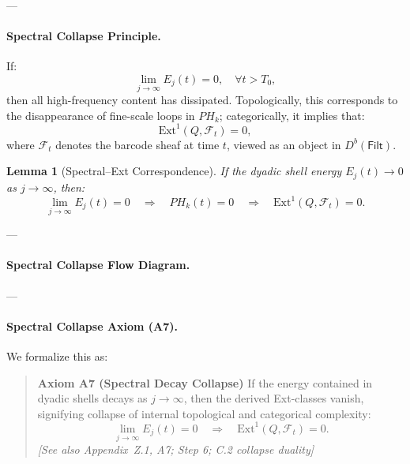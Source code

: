 \documentclass[11pt]{article}
\newtheorem{lemma}[theorem]{Lemma}
\begin{document}
---

\paragraph{Spectral Collapse Principle.}
If:
\[
\lim_{j \to \infty} E_j(t) = 0, \quad \forall t > T_0,
\]
then all high-frequency content has dissipated.  
Topologically, this corresponds to the disappearance of fine-scale loops in \( PH_k \);  
categorically, it implies that:
\[
\mathrm{Ext}^1(Q, \mathcal{F}_t) = 0,
\]
where \( \mathcal{F}_t \) denotes the barcode sheaf at time \( t \), viewed as an object in \( D^b(\mathsf{Filt}) \).

\begin{lemma}[Spectral–Ext Correspondence]
If the dyadic shell energy \( E_j(t) \to 0 \) as \( j \to \infty \), then:
\[
\lim_{j \to \infty} E_j(t) = 0 
\quad \Rightarrow \quad 
PH_k(t) = 0 
\quad \Rightarrow \quad 
\mathrm{Ext}^1(Q, \mathcal{F}_t) = 0.
\]
\end{lemma}

---

\paragraph{Spectral Collapse Flow Diagram.}

\begin{center}
\end{center}

---

\paragraph{Spectral Collapse Axiom (A7).}
We formalize this as:

\begin{quote}
\textbf{Axiom A7 (Spectral Decay Collapse)}  
If the energy contained in dyadic shells decays as \( j \to \infty \),  
then the derived Ext-classes vanish, signifying collapse of internal topological and categorical complexity:
\[
\lim_{j \to \infty} E_j(t) = 0 
\quad \Rightarrow \quad 
\mathrm{Ext}^1(Q, \mathcal{F}_t) = 0.
\]
\textit{[See also Appendix~Z.1, A7; Step 6; C.2 collapse duality]}
\end{quote}
\end{document}
